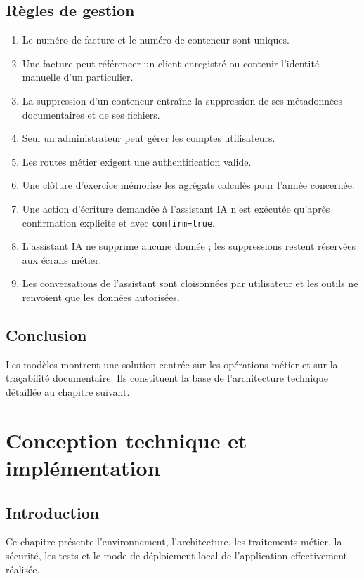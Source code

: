 \documentclass[12pt,a4paper,oneside]{report}
\newcommand{\code}[1]{\texttt{#1}}
\begin{document}
\section{Règles de gestion}
\begin{enumerate}
  \item Le numéro de facture et le numéro de conteneur sont uniques.
  \item Une facture peut référencer un client enregistré ou contenir l'identité manuelle d'un particulier.
  \item La suppression d'un conteneur entraîne la suppression de ses métadonnées documentaires et de ses fichiers.
  \item Seul un administrateur peut gérer les comptes utilisateurs.
  \item Les routes métier exigent une authentification valide.
  \item Une clôture d'exercice mémorise les agrégats calculés pour l'année concernée.
  \item Une action d'écriture demandée à l'assistant IA n'est exécutée qu'après confirmation explicite et avec \code{confirm=true}.
  \item L'assistant IA ne supprime aucune donnée ; les suppressions restent réservées aux écrans métier.
  \item Les conversations de l'assistant sont cloisonnées par utilisateur et les outils ne renvoient que les données autorisées.
\end{enumerate}

\section*{Conclusion}
Les modèles montrent une solution centrée sur les opérations métier et sur la traçabilité documentaire. Ils constituent la base de l'architecture technique détaillée au chapitre suivant.

\chapter{Conception technique et implémentation}
\section*{Introduction}
Ce chapitre présente l'environnement, l'architecture, les traitements métier, la sécurité, les tests et le mode de déploiement local de l'application effectivement réalisée.
\end{document}
